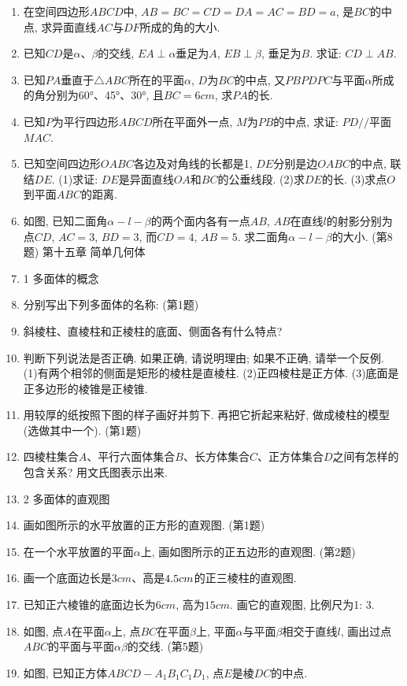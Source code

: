 \documentclass[10pt,a4paper]{article}
\newcommand{\blank}[1]{\underline{\hbox to #1pt{}}}
\begin{document}
\begin{enumerate}[1.]
(2)三个平面可将空间分成\blank{50}个部分.
\item 在空间四边形$ABCD$中, $AB=BC=CD=DA=AC=BD=a$, 是$BC$的中点, 求异面直线$AC$与$DF$所成的角的大小.
\item 已知$CD$是$\alpha$、$\beta$的交线, $EA\perp \alpha$垂足为$A$, $EB\perp \beta$, 垂足为$B$. 求证: $CD\perp AB$.
\item 已知$PA$垂直于$\triangle ABC$所在的平面$\alpha$, $D$为$BC$的中点, 又$PBPDPC$与平面$\alpha$所成的角分别为60°、45°、30°, 且$BC=6cm$, 求$PA$的长.
\item 已知$P$为平行四边形$ABCD$所在平面外一点, $M$为$PB$的中点, 求证: $PD//$平面$MAC$.
\item 已知空间四边形$OABC$各边及对角线的长都是1, $DE$分别是边$OABC$的中点, 联结$DE$.
(1)求证: $DE$是异面直线$OA$和$BC$的公垂线段.
(2)求$DE$的长.
(3)求点$O$到平面$ABC$的距离.
\item 如图, 已知二面角$\alpha -l-\beta$的两个面内各有一点$AB$, $AB$在直线$l$的射影分别为点$CD$, $AC=3$, $BD=3$, 而$CD=4$, $AB=5$. 求二面角$\alpha -l-\beta$的大小.
(第8题)
第十五章  简单几何体
\item 1  多面体的概念
\item 分别写出下列多面体的名称:
(第1题)
\item 斜棱柱、直棱柱和正棱柱的底面、侧面各有什么特点?
\item 判断下列说法是否正确. 如果正确, 请说明理由; 如果不正确, 请举一个反例.
(1)有两个相邻的侧面是矩形的棱柱是直棱柱.
(2)正四棱柱是正方体.
(3)底面是正多边形的棱锥是正棱锥.
\item 用较厚的纸按照下图的样子画好并剪下. 再把它折起来粘好, 做成棱柱的模型(选做其中一个).
(第1题)
\item 四棱柱集合$A$、平行六面体集合$B$、长方体集合$C$、正方体集合$D$之间有怎样的包含关系? 用文氏图表示出来.
\item 2  多面体的直观图
\item 画如图所示的水平放置的正方形的直观图.
(第1题)
\item 在一个水平放置的平面$\alpha$上, 画如图所示的正五边形的直观图.
(第2题)
\item 画一个底面边长是$3cm$、高是$\text4.\text5cm$的正三棱柱的直观图.
\item 已知正六棱锥的底面边长为$6cm$, 高为$15cm$. 画它的直观图, 比例尺为1: 3.
\item 如图, 点$A$在平面$\alpha$上, 点$BC$在平面$\beta$上, 平面$\alpha$与平面$\beta$相交于直线$l$, 画出过点$ABC$的平面与平面$\alpha \beta$的交线.
(第5题)
\item 如图, 已知正方体$ABCD-A_1B_1C_1D_1$, 点$E$是棱$DC$的中点.

\end{enumerate}
\end{document}

